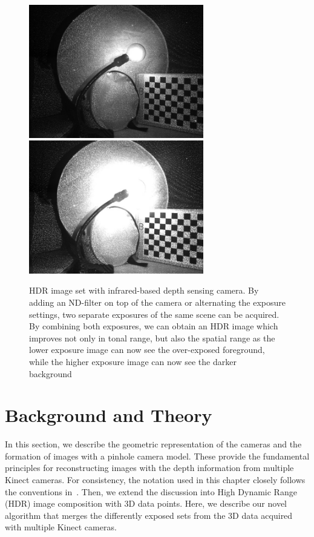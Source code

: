 \begin{figure}
\centering
\includegraphics[width=3.0in]{ch4/diagrams/low_expo_light.jpg} 
\includegraphics[width=3.0in]{ch4/diagrams/high_expo_light.jpg} \\
\caption{HDR image set with infrared-based depth sensing camera. By adding an ND-filter on top of the camera or alternating the exposure settings, two separate exposures of the same scene can be acquired. By combining both exposures, we can obtain an HDR image which improves not only in tonal range, but also the spatial range as the lower exposure image can now see the over-exposed foreground, while the higher exposure image can now see the darker background~\cite{lo2013three}}
\label{fig:ir_hdr}
\end{figure}

\section{Background and Theory}
In this section, we describe the geometric representation of the cameras and the formation of images with a pinhole camera model. These provide the fundamental principles for reconstructing images with the depth information from multiple Kinect cameras.  For consistency, the notation used in this chapter closely follows the conventions in~\cite{wei1994implicit,zhang2000flexible}. Then, we extend the discussion into High Dynamic Range (HDR) image composition with 3D data points. Here, we describe our novel algorithm that merges the differently exposed sets from the 3D data acquired with multiple Kinect cameras.

